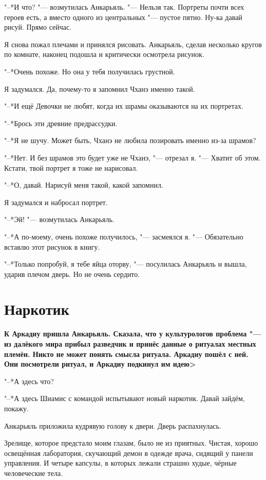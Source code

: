 \documentclass[a4paper,10pt,fleqn]{book}
\newcommand{\ldotst}{\so{...}\xspace}
\begin{document}
"--*И что? "--- возмутилась Анкарьяль.
"--- Нельзя так.
Портреты почти всех героев есть, а вместо одного из центральных "--- пустое пятно.
Ну-ка давай рисуй.
Прямо сейчас.

Я снова пожал плечами и принялся рисовать.
Анкарьяль, сделав несколько кругов по комнате, наконец подошла и критически осмотрела рисунок.

"--*Очень похоже.
Но она у тебя получилась грустной.

Я задумался.
Да, почему-то я запомнил Чханэ именно такой.

"--*И ещё\ldotst Девочки не любят, когда их шрамы оказываются на их портретах.

"--*Брось эти древние предрассудки.

"--*Я не шучу.
Может быть, Чханэ не любила позировать именно из-за шрамов?

"--*Нет.
И без шрамов это будет уже не Чханэ, "--- отрезал я.
"--- Хватит об этом.
Кстати, твой портрет я тоже не нарисовал.

"--*О, давай.
Нарисуй меня такой, какой запомнил.

Я задумался и набросал портрет.

"--*Эй! "--- возмутилась Анкарьяль.

"--*А по-моему, очень похоже получилось, "--- засмеялся я.
"--- Обязательно вставлю этот рисунок в книгу.

"--*Только попробуй, я тебе яйца оторву, "--- посулилась Анкарьяль и вышла, ударив плечом дверь.
Но не очень сердито.

\section{Наркотик}

\textbf{К Аркадиу пришла Анкарьяль.
Сказала, что у культурологов проблема "--- из далёкого мира прибыл разведчик и принёс данные о ритуалах местных племён.
Никто не может понять смысла ритуала.
Аркадиу пошёл с ней.
Они посмотрели ритуал, и Аркадиу подкинул им идею>}

"--*А здесь что?

"--*А здесь Шиамис с командой испытывают новый наркотик.
Давай зайдём, покажу.

Анкарьяль приложила кудрявую голову к двери.
Дверь распахнулась.

Зрелище, которое предстало моим глазам, было не из приятных.
Чистая, хорошо освещённая лаборатория, скучающий демон в одежде врача, сидящий у панели управления.
И четыре капсулы, в которых лежали страшно худые, чёрные человеческие тела.
\end{document}
